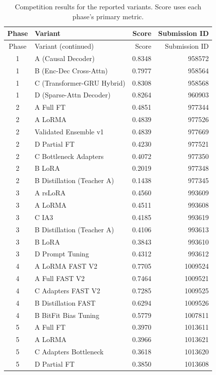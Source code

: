 \documentclass[11pt, oneside]{article}
\begin{document}
\begingroup\scriptsize\setlength{\tabcolsep}{4pt}
\begin{longtable}{clrr}
\caption{Competition results for the reported variants. Score uses each phase's primary metric.}\label{tab:variants}\\
\toprule Phase & Variant & Score & Submission ID\\\midrule\endfirsthead
\toprule Phase & Variant (continued) & Score & Submission ID\\\midrule\endhead
1 & A (Causal Decoder) & 0.8348 & 958572 \\
1 & B (Enc-Dec Cross-Attn) & 0.7977 & 958564 \\
1 & C (Transformer-GRU Hybrid) & 0.8308 & 958568 \\
1 & D (Sparse-Attn Decoder) & 0.8264 & 960903 \\
2 & A Full FT & 0.4851 & 977344 \\
2 & A LoRMA  & 0.4839 & 977526 \\
2 & Validated Ensemble v1 & 0.4839 & 977669 \\
2 & D Partial FT & 0.4230 & 977521 \\
2 & C Bottleneck Adapters & 0.4072 & 977350 \\
2 & B LoRA  & 0.2019 & 977348 \\
2 & B Distillation (Teacher A) & 0.1438 & 977345 \\
3 & A rsLoRA  & 0.4560 & 993609 \\
3 & A LoRMA  & 0.4511 & 993608 \\
3 & C IA3  & 0.4185 & 993619 \\
3 & B Distillation (Teacher A) & 0.4106 & 993613 \\
3 & B LoRA  & 0.3843 & 993610 \\
3 & D Prompt Tuning & 0.4312 & 993612 \\
4 & A LoRMA FAST V2 & 0.7705 & 1009524 \\
4 & A Full FAST V2 & 0.7464 & 1009521 \\
4 & C Adapters FAST V2 & 0.7285 & 1009525 \\
4 & B Distillation FAST & 0.6294 & 1009526 \\
4 & B BitFit Bias Tuning & 0.5779 & 1007811 \\
5 & A Full FT & 0.3970 & 1013611 \\
5 & A LoRMA  & 0.3966 & 1013621 \\
5 & C Adapters Bottleneck & 0.3618 & 1013620 \\
5 & D Partial FT & 0.3850 & 1013608 \\

\end{longtable}
\end{document}
